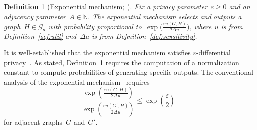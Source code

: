 \documentclass[conference]{ieeeconf}
\newtheorem{definition}{Definition}
\newcommand{\G}{\mathcal{G}}
\begin{document}
\begin{definition}[{Exponential mechanism;~\cite[Chapter 3.4]{dwork2014algorithmic}}]
    Fix a privacy parameter~$\varepsilon\geq0$ and an adjacency parameter~$A \in \mathbb{N}$. 
    The exponential mechanism selects and outputs a graph~$H\in \G_n$ with probability proportional to~$\exp\big(\frac{\varepsilon u(G,H)}{2\Delta u}\big)$, where~$u$ is from Definition~\ref{def:util} and~$\Delta u$ is from Definition~\ref{def:sensitivity}.
    \label{def:exponential_mechanism}
\end{definition}

It is well-established that the exponential mechanism satisfies $\varepsilon$-differential privacy~\cite[Chapter 3.4]{dwork2014algorithmic}.
As stated, Definition~\ref{def:exponential_mechanism} requires the computation of a normalization constant
to compute probabilities of generating specific outputs. The conventional analysis
of the exponential mechanism~\cite[Chapter 3.4]{dwork2014algorithmic} 
requires 
\begin{equation} \label{eq:epsover2bound}
\frac{\exp\left(\frac{\varepsilon u(G,H)}{2\Delta u}\right)}{\exp\left(\frac{\varepsilon u(G',H)}{2\Delta u}\right)} \leq \exp\left(\frac{\varepsilon}{2}\right)
\end{equation}
for adjacent
graphs~$G$ and~$G'$. 
\end{document}
